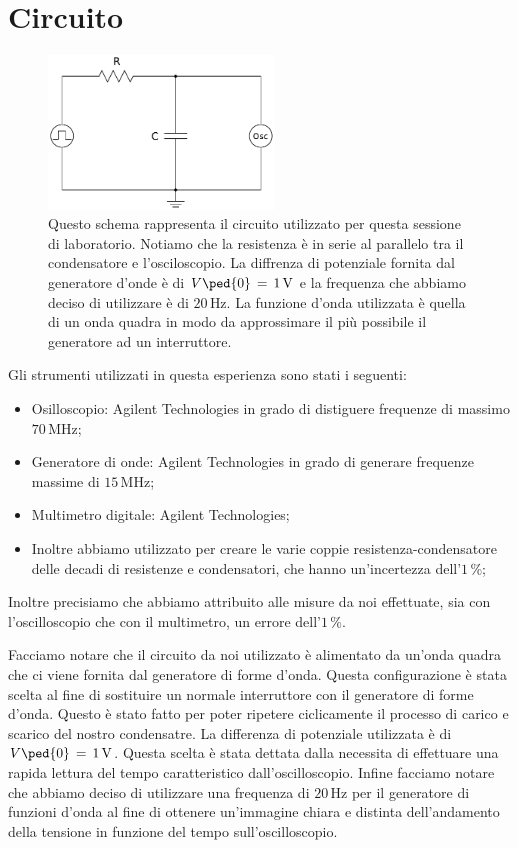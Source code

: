 \section*{Circuito}

\begin{figure}
    \includegraphics[width=60mm]{schema.pdf}
    \caption{Questo schema rappresenta il circuito utilizzato per questa sessione di laboratorio. Notiamo che la resistenza è in serie al parallelo tra il condensatore e l'osciloscopio. La diffrenza di potenziale fornita dal generatore d'onde è di $V\ped{0} \,=\, 1\,\si{\volt}$ e la frequenza che abbiamo deciso di utilizzare è di $20\,\si{\hertz}$. La funzione d'onda utilizzata è quella di un onda quadra in modo da approssimare il più possibile il generatore ad un interruttore.}
\end{figure}

Gli strumenti utilizzati in questa esperienza sono stati i seguenti:
\begin{itemize}
	\item{Osilloscopio: Agilent Technologies in grado di distiguere frequenze di massimo $70\,\si{\mega\hertz}$;}
	\item{Generatore di onde: Agilent Technologies in grado di generare frequenze massime di $15\,\si{\mega\hertz}$;}
	\item{Multimetro digitale: Agilent Technologies;}
	\item{Inoltre abbiamo utilizzato per creare le varie coppie resistenza-condensatore delle decadi di resistenze e condensatori, che hanno un'incertezza dell'$1\,\%$;}
\end{itemize}
%
Inoltre precisiamo che abbiamo attribuito alle misure da noi effettuate, sia con l'oscilloscopio che con il multimetro, un errore dell'$1\,\%$.

Facciamo notare che il circuito da noi utilizzato è alimentato da un'onda quadra che ci viene fornita dal generatore di forme d'onda. Questa configurazione è stata scelta al fine di sostituire un normale interruttore con il generatore di forme d'onda. Questo è stato fatto per poter ripetere ciclicamente il processo di carico e scarico del nostro condensatre.
La differenza di potenziale utilizzata è di $V\ped{0} \,=\, 1\,\si{\volt}$. Questa scelta è stata dettata dalla necessita di effettuare una rapida lettura del tempo caratteristico dall'oscilloscopio. Infine facciamo notare che abbiamo deciso di utilizzare una frequenza di $20\,\si{\hertz}$ per il generatore di funzioni d'onda al fine di ottenere un'immagine chiara e distinta dell'andamento della tensione in funzione del tempo sull'oscilloscopio.